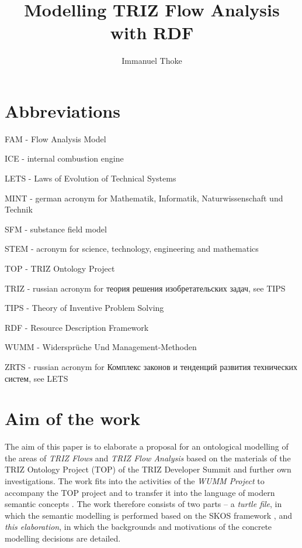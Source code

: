 \documentclass[a4paper,11pt]{article}
\author{Immanuel Thoke}
\title{Modelling TRIZ Flow Analysis with RDF}
\begin{document}
    \maketitle
    \tableofcontents
    \newpage
    \section{Abbreviations}
    FAM - Flow Analysis Model

    ICE - internal combustion engine

    LETS - Laws of Evolution of Technical Systems

    MINT - german acronym for Mathematik, Informatik, Naturwissenschaft und Technik
    
    SFM - substance field model

    STEM - acronym for science, technology, engineering and mathematics

    TOP - TRIZ Ontology Project

    TRIZ - russian acronym for \foreignlanguage{russian}{теория решения изобретательских задач}, see TIPS

    TIPS - Theory of Inventive Problem Solving 

    RDF - Resource Description Framework 

    WUMM - Widersprüche Und Management-Methoden

    ZRTS - russian acronym for \foreignlanguage{russian}{Комплекс законов и тенденций развития технических систем}, see LETS

    \newpage

    \section{Aim of the work}

    The aim of this paper is to elaborate a proposal for an ontological modelling
    of the areas of \emph{TRIZ Flows} and \emph{TRIZ Flow Analysis} based on the
    materials of the TRIZ Ontology Project (TOP) of the TRIZ Developer Summit
    \cite{TOP} and further own investigations. The work fits into the activities
    of the \emph{WUMM Project} \cite{WUMM} to accompany the TOP project and to
    transfer it into the language of modern semantic concepts
    \cite{WUMMTOP}.  The work therefore consists of two parts -- a
    \emph{turtle file}, in which the semantic modelling is performed based on the
    SKOS framework \cite{SKOS}, and \emph{this elaboration}, in which the
    backgrounds and motivations of the concrete modelling decisions are detailed.
\end{document}
